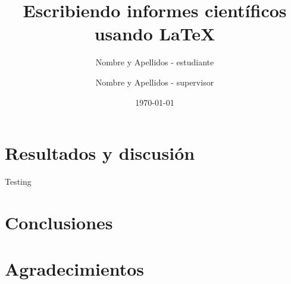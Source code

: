 \title			{Escribiendo informes científicos usando \LaTeX}
\author         {Nombre y Apellidos - estudiante} %
\author         {Nombre y Apellidos - supervisor}%
\date{\today} %

\begin{abstract}
\end{abstract}

\maketitle


\section{Resultados y discusión}
Testing \cite{feynman1982}

\section{Conclusiones}


\section*{Agradecimientos} 





\clearpage
\appendix



